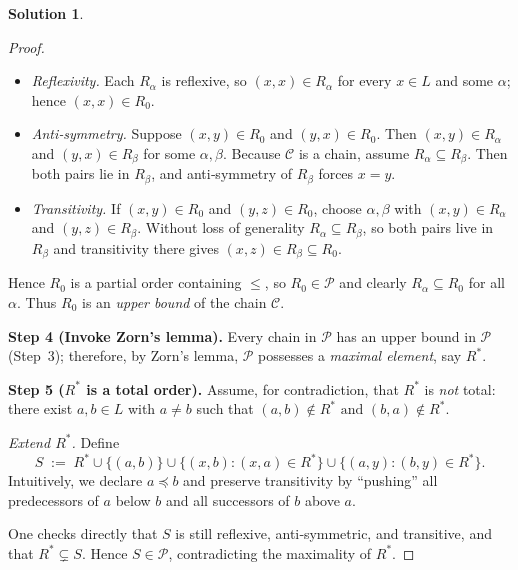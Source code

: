 \documentclass[12pt]{article}
\theoremstyle{definition} %
\newtheorem{solution}{Solution}
\theoremstyle{plain} %
\begin{document}
\begin{solution}
\begin{proof}
        \begin{itemize}
          \item \emph{Reflexivity.}
                Each $R_\alpha$ is reflexive, so $(x,x)\in R_\alpha$ for every
                $x\in L$ and some $\alpha$; hence $(x,x)\in R_0$.
          \item \emph{Anti‑symmetry.}
                Suppose $(x,y)\in R_0$ and $(y,x)\in R_0$.
                Then $(x,y)\in R_{\alpha}$ and $(y,x)\in R_{\beta}$ for some
                $\alpha,\beta$.
                Because $\mathcal C$ is a chain, assume $R_{\alpha}\subseteq R_{\beta}$.
                Then both pairs lie in $R_{\beta}$, and anti‑symmetry of
                $R_{\beta}$ forces $x=y$.
          \item \emph{Transitivity.}
                If $(x,y)\in R_0$ and $(y,z)\in R_0$, choose
                $\alpha,\beta$ with $(x,y)\in R_\alpha$ and $(y,z)\in R_\beta$.
                Without loss of generality $R_\alpha\subseteq R_\beta$,
                so both pairs live in $R_\beta$ and transitivity there
                gives $(x,z)\in R_\beta\subseteq R_0$.
        \end{itemize}
        Hence $R_0$ is a partial order containing $\le$,
        so $R_0\in\mathcal P$ and clearly $R_\alpha\subseteq R_0$
        for all $\alpha$.
        Thus $R_0$ is an \emph{upper bound} of the chain $\mathcal C$.
        
        \bigskip
        \textbf{Step 4 (Invoke Zorn’s lemma).}
        Every chain in $\mathcal P$ has an upper bound in $\mathcal P$ (Step 3);
        therefore, by Zorn’s lemma, $\mathcal P$ possesses a
        \emph{maximal element}, say $R^\ast$.
        
        \bigskip
        \textbf{Step 5 ($R^\ast$ is a total order).}
        Assume, for contradiction, that $R^\ast$ is \emph{not} total:
        there exist $a,b\in L$ with $a\neq b$ such that
        \(
          (a,b)\notin R^\ast \text{ and } (b,a)\notin R^\ast.
        \)
        
        \smallskip
        \emph{Extend $R^\ast$.}
        Define
        \[
          S\;:=\;R^\ast \cup \bigl\{(a,b)\bigr\}
                    \cup \bigl\{(x,b) : (x,a)\in R^\ast\bigr\}
                    \cup \bigl\{(a,y) : (b,y)\in R^\ast\bigr\}.
        \]
        Intuitively, we declare $a\preceq b$ and preserve transitivity by
        “pushing” all predecessors of $a$ below $b$
        and all successors of $b$ above $a$.
        
        One checks directly that $S$ is still
        reflexive, anti‑symmetric, and transitive, and that $R^\ast\subsetneq S$.
        Hence $S\in\mathcal P$, contradicting the maximality of $R^\ast$.
        

\end{proof}
\end{solution}
\end{document}
